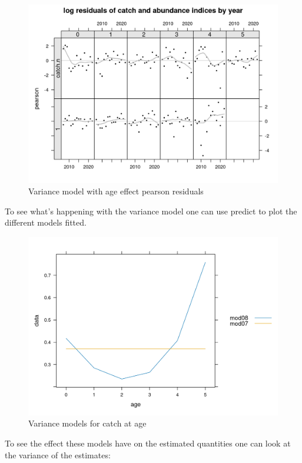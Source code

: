 \documentclass[
]{book}
\begin{document}
\begin{figure}
\centering
\includegraphics{_bookdown_files/_main_files/figure-html/vresbyyear08-1.png}
\caption{\label{fig:vresbyyear08}Variance model with age effect pearson residuals}
\end{figure}

To see what's happening with the variance model one can use predict to plot the different models fitted.

\begin{figure}
\centering
\includegraphics{_bookdown_files/_main_files/figure-html/vagepredbyage-1.png}
\caption{\label{fig:vagepredbyage}Variance models for catch at age}
\end{figure}

To see the effect these models have on the estimated quantities one can look at the variance of the estimates:
\end{document}
